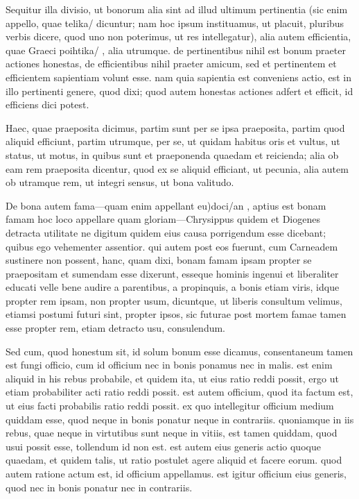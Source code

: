  Sequitur illa divisio, ut bonorum alia sint ad illud ultimum pertinentia (sic enim appello, quae telika/ dicuntur; nam hoc ipsum instituamus, ut placuit, pluribus verbis dicere, quod uno non poterimus, ut res intellegatur), alia autem efficientia, quae Graeci poihtika/ , alia utrumque. de pertinentibus nihil est bonum praeter actiones honestas, de efficientibus nihil praeter amicum, sed et pertinentem et efficientem sapientiam volunt esse. nam quia sapientia est conveniens actio, est in illo pertinenti genere, quod dixi; quod autem honestas actiones adfert et efficit, id efficiens dici potest.

 Haec, quae praeposita dicimus, partim sunt per se ipsa praeposita, partim quod aliquid efficiunt, partim utrumque, per se, ut quidam habitus oris et vultus, ut status, ut motus, in quibus sunt et praeponenda quaedam et reicienda; alia ob eam rem praeposita dicentur, quod ex se aliquid efficiant, ut pecunia, alia autem ob utramque rem, ut integri sensus, ut bona valitudo.

 De bona autem fama—quam enim appellant eu)doci/an , aptius est bonam famam hoc loco appellare quam gloriam—Chrysippus quidem et Diogenes detracta utilitate ne digitum quidem eius causa porrigendum esse dicebant; quibus ego vehementer assentior. qui autem post eos fuerunt, cum Carneadem sustinere non possent, hanc, quam dixi, bonam famam ipsam propter se praepositam et sumendam esse dixerunt, esseque hominis ingenui et liberaliter educati velle bene audire a parentibus, a propinquis, a bonis etiam viris, idque propter rem ipsam, non propter usum, dicuntque, ut liberis consultum velimus, etiamsi postumi futuri sint, propter ipsos, sic futurae post mortem famae tamen esse propter rem, etiam detracto usu, consulendum.

 Sed cum, quod honestum sit, id solum bonum esse dicamus, consentaneum tamen est fungi officio, cum id officium nec in bonis ponamus nec in malis. est enim aliquid in his rebus probabile, et quidem ita, ut eius ratio reddi possit, ergo ut etiam probabiliter acti ratio reddi possit. est autem officium, quod ita factum est, ut eius facti probabilis ratio reddi possit. ex quo intellegitur officium medium quiddam esse, quod neque in bonis ponatur neque in contrariis. quoniamque in iis rebus, quae neque in virtutibus sunt neque in vitiis, est tamen quiddam, quod usui possit esse, tollendum id non est. est autem eius generis actio quoque quaedam, et quidem talis, ut ratio postulet agere aliquid et facere eorum. quod autem ratione actum est, id officium appellamus. est igitur officium eius generis, quod nec in bonis ponatur nec in contrariis.

